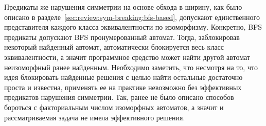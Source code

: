 Предикаты же нарушения симметрии на основе обхода в ширину, как было описано в разделе~\ref{sec:review:sym-breaking:bfs-based}, допускают единственного представителя каждого класса эквивалентности по изоморфизму.
Конкретно, BFS предикаты допускают BFS пронумерованный автомат.
Тогда, заблокировав некоторый найденный автомат, автоматически блокируется весь класс эквивалентности, а значит программное средство может найти другой автомат неизоморфный ранее найденным.
Необходимо заметить, что несмотря на то, что идея блокировать найденные решения с целью найти остальные достаточно проста и известна, применять ее на практике невозможно без эффективных предикатов нарушения симметрии.
Так, ранее не было описано способов бороться с факториальным числом изоморфных автоматов, а значит и рассматриваемая задача не имела эффективного решения.
